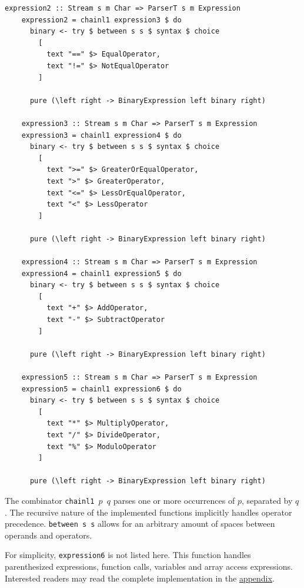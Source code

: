 \documentclass[UdineBachThesis,american,11pt]{PhdThesis}
\begin{document}
  \pagebreak

  \begin{Verbatim}[gobble=4,fontsize=\small]
    expression2 :: Stream s m Char => ParserT s m Expression
    expression2 = chainl1 expression3 $ do
      binary <- try $ between s s $ syntax $ choice
        [
          text "==" $> EqualOperator,
          text "!=" $> NotEqualOperator
        ]

      pure (\left right -> BinaryExpression left binary right)

    expression3 :: Stream s m Char => ParserT s m Expression
    expression3 = chainl1 expression4 $ do
      binary <- try $ between s s $ syntax $ choice
        [
          text ">=" $> GreaterOrEqualOperator,
          text ">" $> GreaterOperator,
          text "<=" $> LessOrEqualOperator,
          text "<" $> LessOperator
        ]

      pure (\left right -> BinaryExpression left binary right)

    expression4 :: Stream s m Char => ParserT s m Expression
    expression4 = chainl1 expression5 $ do
      binary <- try $ between s s $ syntax $ choice
        [
          text "+" $> AddOperator,
          text "-" $> SubtractOperator
        ]

      pure (\left right -> BinaryExpression left binary right)

    expression5 :: Stream s m Char => ParserT s m Expression
    expression5 = chainl1 expression6 $ do
      binary <- try $ between s s $ syntax $ choice
        [
          text "*" $> MultiplyOperator,
          text "/" $> DivideOperator,
          text "%" $> ModuloOperator
        ]

      pure (\left right -> BinaryExpression left binary right)
  \end{Verbatim}

  The combinator \mbox{\texttt{chainl1 $p$ $q$}} parses one or more occurrences
  of $p$, separated by $q$. The recursive nature of the implemented functions
  implicitly handles operator precedence. \mbox{\texttt{between s s}} allows for
  an arbitrary amount of spaces between operands and operators.

  For simplicity, \mbox{\texttt{expression6}} is not listed here. This function
  handles parenthesized expressions, function calls, variables and array access
  expressions. Interested readers may read the complete implementation in the
  \hyperref[chapter:devin-source-code]{appendix}.

  \newpage
\end{document}
